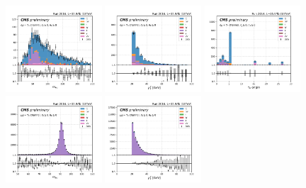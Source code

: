 \begin{figure}
    \centering
    \includegraphics[width=0.32\textwidth]{chapters/Analysis/sectionCalibration/figures/jetToTauh/emutau_dilepton_mass_pickles_lltauvTight.png}
    \includegraphics[width=0.32\textwidth]{chapters/Analysis/sectionCalibration/figures/jetToTauh/emutau_tauPt_pickles_lltauVTight.png}
    \includegraphics[width=0.32\textwidth]{chapters/Analysis/sectionCalibration/figures/jetToTauh/emutau_tauGenFlavor_pickles_lltauVTight.png}
    \includegraphics[width=0.32\textwidth]{chapters/Analysis/sectionCalibration/figures/jetToTauh/mumutau_dilepton_mass_pickles_lltauVTight.png}
    \includegraphics[width=0.32\textwidth]{chapters/Analysis/sectionCalibration/figures/jetToTauh/mumutau_tauPt_pickles_lltauVTight.png}

\end{figure}
